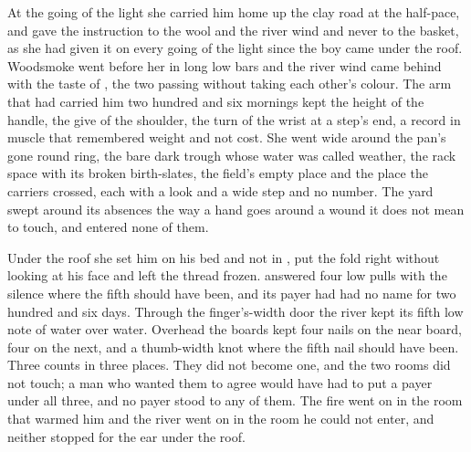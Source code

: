 \scenebreak

At the going of the light she carried him home up the clay road at the half-pace, and gave the instruction to the wool and the river wind and never to the basket, as she had given it on every going of the light since the boy came under the roof. Woodsmoke went before her in long low bars and the river wind came behind with the taste of , the two passing without taking each other's colour. The arm that had carried him two hundred and six mornings kept the height of the handle, the give of the shoulder, the turn of the wrist at a step's end, a record in muscle that remembered weight and not cost. She went wide around the pan's gone round ring, the bare dark trough whose water was called weather, the rack space with its broken birth-slates, the field's empty place and the place the carriers crossed, each with a look and a wide step and no number. The yard swept around its absences the way a hand goes around a wound it does not mean to touch, and entered none of them.

Under the roof she set him on his bed and not in , put the fold right without looking at his face and left the thread frozen.  answered four low pulls with the silence where the fifth should have been, and its payer had had no name for two hundred and six days. Through the finger's-width door the river kept its fifth low note of water over water. Overhead the boards kept four nails on the near board, four on the next, and a thumb-width knot where the fifth nail should have been. Three counts in three places. They did not become one, and the two rooms did not touch; a man who wanted them to agree would have had to put a payer under all three, and no payer stood to any of them. The fire went on in the room that warmed him and the river went on in the room he could not enter, and neither stopped for the ear under the roof.

\scenebreak

